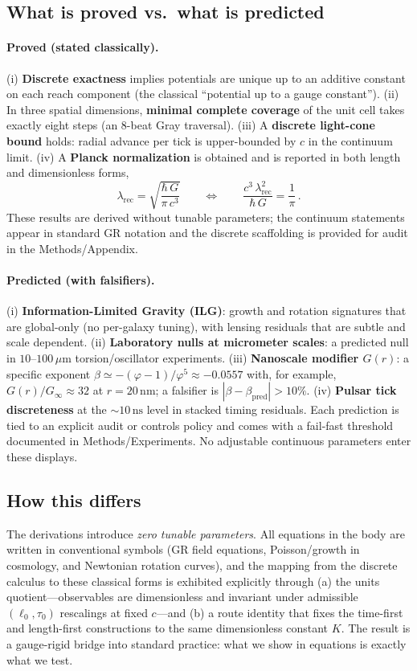 \documentclass[11pt]{article}
\begin{document}
\subsection*{What is proved vs.\ what is predicted}

\paragraph{Proved (stated classically).}
(i) \textbf{Discrete exactness} implies potentials are unique up to an additive constant on each reach component (the classical ``potential up to a gauge constant''). (ii) In three spatial dimensions, \textbf{minimal complete coverage} of the unit cell takes exactly eight steps (an 8-beat Gray traversal). (iii) A \textbf{discrete light-cone bound} holds: radial advance per tick is upper-bounded by $c$ in the continuum limit. (iv) A \textbf{Planck normalization} is obtained and is reported in both length and dimensionless forms,
\[
\lambda_{\mathrm{rec}}=\sqrt{\frac{\hbar\,G}{\pi\,c^{3}}}\qquad\Longleftrightarrow\qquad
\frac{c^{3}\,\lambda_{\mathrm{rec}}^{2}}{\hbar\,G}=\frac{1}{\pi}\,.
\]
These results are derived without tunable parameters; the continuum statements appear in standard GR notation and the discrete scaffolding is provided for audit in the Methods/Appendix.

\paragraph{Predicted (with falsifiers).}
(i) \textbf{Information-Limited Gravity (ILG)}: growth and rotation signatures that are 
global-only (no per-galaxy tuning), with lensing residuals that are subtle and scale dependent. 
(ii) \textbf{Laboratory nulls at micrometer scales}: a predicted null in 
$10$--$100\,\mu\mathrm{m}$ torsion/oscillator experiments. 
(iii) \textbf{Nanoscale modifier $G(r)$}: a specific exponent 
$\beta\simeq -(\varphi-1)/\varphi^{5}\approx -0.0557$ with, for example, 
$G(r)/G_\infty\approx 32$ at $r=20\,\mathrm{nm}$; a falsifier is $|\beta-\beta_{\mathrm{pred}}|>10\%$. 
(iv) \textbf{Pulsar tick discreteness} at the $\sim 10\,\mathrm{ns}$ level in stacked timing residuals. 
Each prediction is tied to an explicit audit or controls policy and comes with a fail-fast 
threshold documented in Methods/Experiments. No adjustable continuous parameters enter these displays.

\subsection*{How this differs}
The derivations introduce \emph{zero tunable parameters}. All equations in the body are written in conventional symbols (GR field equations, Poisson/growth in cosmology, and Newtonian rotation curves), and the mapping from the discrete calculus to these classical forms is exhibited explicitly through (a) the units quotient---observables are dimensionless and invariant under admissible $(\ell_0,\tau_0)$ rescalings at fixed $c$---and (b) a route identity that fixes the time-first and length-first constructions to the same dimensionless constant $K$. The result is a gauge-rigid bridge into standard practice: what we show in equations is exactly what we test.
\end{document}
